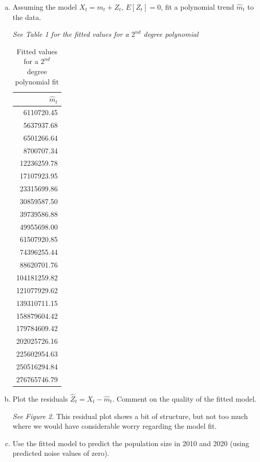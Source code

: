 \documentclass[a4paper, 11pt]{article}
\begin{document}
\begin{itemize}
\begin{enumerate}[(a)]
		\item Assuming the model $X_t = m_t + Z_t$, $E[Z_t] = 0$, fit a polynomial trend $\widehat{m}_t$ to the data. \newline 
		
		\emph{See Table 1 for the fitted values for a $2^{nd}$ degree polynomial}
		
\begin{table}[h!]
\small
\centering
\begin{tabular}{r}
  \hline
	$\widehat{m}_t$\\ 
  \hline
	6110720.45 \\ 
  5637937.68 \\ 
  6501266.64 \\ 
  8700707.34 \\ 
  12236259.78 \\ 
  17107923.95 \\ 
  23315699.86 \\ 
  30859587.50 \\ 
  39739586.88 \\ 
  49955698.00 \\ 
  61507920.85 \\ 
  74396255.44 \\ 
  88620701.76 \\ 
  104181259.82 \\ 
  121077929.62 \\ 
  139310711.15 \\ 
  158879604.42 \\ 
  179784609.42 \\ 
  202025726.16 \\ 
  225602954.63 \\ 
  250516294.84 \\ 
  276765746.79 \\ 
   \hline
\end{tabular}
\caption{Fitted values for a $2^{nd}$ degree polynomial fit}
\end{table}

		\item Plot the residuals $\hat{Z}_t = X_t - \hat{m}_t$. Comment on the quality of the fitted model. \newline 

		\emph{See Figure 2.} This residual plot shows a bit of structure, but not too much where we would have considerable worry regarding the model fit. 
		\item Use the fitted model to predict the population size in 2010 and 2020 (using predicted noise values of zero). \newline 
		

\end{enumerate}
\end{itemize}
\end{document}
